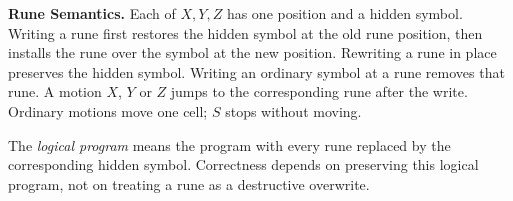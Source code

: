 \documentclass[11pt,a4paper]{article}
\newcommand{\blank}{\lambda}
\begin{document}
\begin{center}
\end{center}

\textbf{Rune Semantics.}
Each of $X,Y,Z$ has one position and a hidden symbol. Writing a rune first
restores the hidden symbol at the old rune position, then installs the rune over
the symbol at the new position. Rewriting a rune in place preserves the hidden symbol. Writing an ordinary symbol at a rune removes that rune.
A motion $X$, $Y$ or $Z$ jumps to the corresponding rune after the write.
Ordinary motions move one cell; $S$ stops without moving.

The \emph{logical program} means the program with every rune replaced by the corresponding hidden symbol. Correctness depends on preserving this logical program,
not on treating a rune as a destructive overwrite.

\newpage
\end{document}
